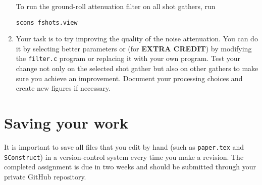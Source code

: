 \begin{enumerate}



To run the ground-roll attenuation filter on all shot gathers, run
\begin{verbatim}
scons fshots.view
\end{verbatim}

\item Your task is to try improving the quality of the noise attenuation. You can do it by selecting better parameters or (for \textbf{EXTRA CREDIT}) by modifying the \texttt{filter.c} program or replacing it with your own program. Test your change not only on the selected shot gather but also on other gathers to make sure you achieve an improvement. Document your processing choices and create new figures if necessary.

\lstset{language=c,numbers=left,numberstyle=\tiny,showstringspaces=false}


\lstset{language=python,numbers=left,numberstyle=\tiny,showstringspaces=false}


\end{enumerate}

\section{Saving your work}

It is important to save all files that you edit by hand (such
as \texttt{paper.tex} and \texttt{SConstruct}) in a version-control
system every time you make a revision.  The completed assignment is
due in two weeks and should be submitted through your private GitHub
repository.



